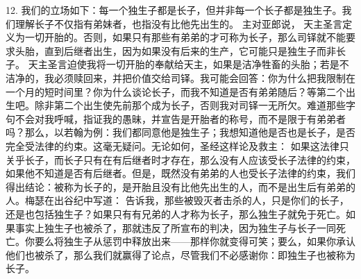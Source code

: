 12. 我们的立场如下：每一个独生子都是长子，但并非每一个长子都是独生子。我们理解长子不仅指有弟妹者，也指没有比他先出生的。 主对亚郎说， 天主圣言定义为一切开胎的。否则，如果只有那些有弟弟的才可称为长子，那么司铎就不能要求头胎，直到后继者出生，因为如果没有后来的生产，它可能只是独生子而非长子。  天主圣言迫使我将一切开胎的奉献给天主，如果是洁净牲畜的头胎；若是不洁净的，我必须赎回来，并把价值交给司铎。我可能会回答：你为什么把我限制在一个月的短时间里？你为什么谈论长子，而我不知道是否有弟弟随后？等第二个出生吧。除非第二个出生使先前那个成为长子，否则我对司铎一无所欠。难道那些字句不会对我呼喊，指证我的愚昧，并宣告是开胎者的称号，而不是限于有弟弟者吗？那么，以若翰为例：我们都同意他是独生子；我想知道他是否也是长子，是否完全受法律的约束。这毫无疑问。无论如何，圣经这样论及救主： 如果这法律只关乎长子，而长子只有在有后继者时才存在，那么没有人应该受长子法律的约束，如果他不知道是否有后继者。但是，既然没有弟弟的人也受长子法律的约束，我们得出结论：被称为长子的，是开胎且没有比他先出生的人，而不是出生后有弟弟的人。梅瑟在出谷纪中写道：  告诉我，那些被毁灭者击杀的人，只是你们的长子，还是也包括独生子？如果只有有兄弟的人才称为长子，那么独生子就免于死亡。如果事实上独生子也被杀了，那就违反了所宣布的判决，因为独生子与长子一同死亡。你要么将独生子从惩罚中释放出来——那样你就变得可笑；要么，如果你承认他们也被杀了，那么我们就赢得了论点，尽管我们不必感谢你：即独生子也被称为长子。\par

